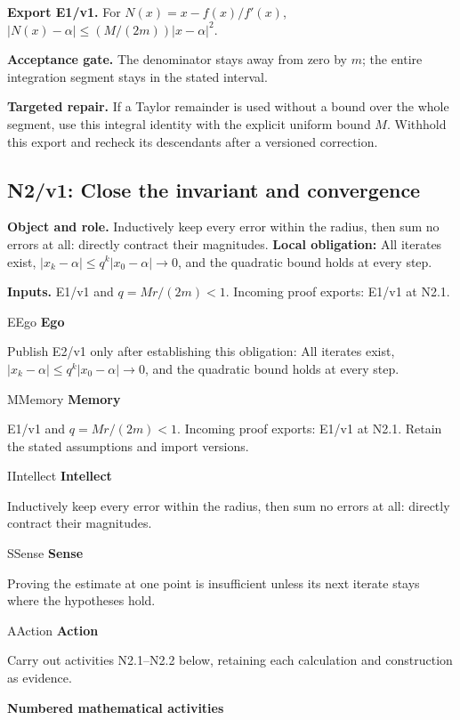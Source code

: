 \documentclass[preprint,12pt,aps,pra,showkeys,amsmath,amssymb,superscriptaddress,floatfix]{revtex4-2}
\theoremstyle{definition}
\theoremstyle{remark}
\newcommand{\mmfaculty}[3]{%
 \begin{mmfacultybox}{#1}{#2}
 {\sffamily\bfseries\color{MMBlue}#2}\par\smallskip #3
 \end{mmfacultybox}}
\newcommand{\field}[2]{\par\smallskip\noindent\textbf{#1.} #2\par}
\begin{document}
\field{Export E1/v1}{For \(N(x)=x-f(x)/f'(x)\), \(|N(x)-\alpha|\le (M/(2m))|x-\alpha|^2\).}

\field{Acceptance gate}{The denominator stays away from zero by \(m\); the entire integration
segment stays in the stated interval.}

\field{Targeted repair}{If a Taylor remainder is used without a bound over the whole segment,
use this integral identity with the explicit uniform bound \(M\).
Withhold this export and recheck its descendants after a versioned
correction.}

\clearpage

\subsection{N2/v1: Close the invariant and convergence}

\field{Object and role}{Inductively keep every error within the radius, then sum no errors at
all: directly contract their magnitudes. \textbf{Local obligation:} All
iterates exist, \(|x_k-\alpha|\le q^k|x_0-\alpha|\to0\), and the
quadratic bound holds at every step.}

\field{Inputs}{E1/v1 and \(q=Mr/(2m)<1\). Incoming proof exports: E1/v1 at N2.1.}

\mmfaculty{E}{Ego}{Publish E2/v1 only after establishing this obligation: All iterates
exist, \(|x_k-\alpha|\le q^k|x_0-\alpha|\to0\), and the quadratic bound
holds at every step.}

\mmfaculty{M}{Memory}{E1/v1 and \(q=Mr/(2m)<1\). Incoming proof exports: E1/v1 at N2.1. Retain
the stated assumptions and import versions.}

\mmfaculty{I}{Intellect}{Inductively keep every error within the radius, then sum no errors at
all: directly contract their magnitudes.}

\mmfaculty{S}{Sense}{Proving the estimate at one point is insufficient unless its next
iterate stays where the hypotheses hold.}

\mmfaculty{A}{Action}{Carry out activities N2.1--N2.2 below, retaining each calculation and
construction as evidence.}

\smallskip\noindent\textbf{Numbered mathematical activities}
\end{document}
